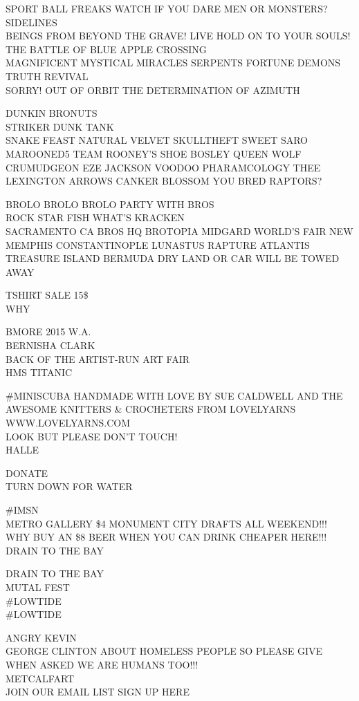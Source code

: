 \documentclass[10pt,letterpaper]{article}
\begin{document}
SPORT BALL FREAKS WATCH IF YOU DARE MEN OR MONSTERS?  SIDELINES\\
BEINGS FROM BEYOND THE GRAVE!   LIVE HOLD ON TO YOUR SOULS!  THE BATTLE OF BLUE APPLE CROSSING\\
MAGNIFICENT MYSTICAL MIRACLES SERPENTS FORTUNE DEMONS TRUTH REVIVAL\\
SORRY!  OUT OF ORBIT THE DETERMINATION OF AZIMUTH

DUNKIN BRONUTS\\
STRIKER DUNK TANK\\
SNAKE FEAST NATURAL VELVET SKULLTHEFT SWEET SARO MAROONED5 TEAM ROONEY'S SHOE BOSLEY QUEEN WOLF CRUMUDGEON EZE JACKSON VOODOO PHARAMCOLOGY THEE LEXINGTON ARROWS CANKER BLOSSOM YOU BRED RAPTORS?

BROLO BROLO BROLO PARTY WITH BROS\\
ROCK STAR FISH WHAT'S KRACKEN\\
SACRAMENTO CA BROS HQ BROTOPIA MIDGARD WORLD'S FAIR NEW MEMPHIS CONSTANTINOPLE LUNASTUS RAPTURE ATLANTIS TREASURE ISLAND BERMUDA DRY LAND OR CAR WILL BE TOWED AWAY

TSHIRT SALE 15\$\\
WHY

BMORE 2015 W.A.\\
BERNISHA CLARK\\
BACK OF THE ARTIST{-}RUN ART FAIR\\
HMS TITANIC

\#MINISCUBA HANDMADE WITH LOVE BY SUE CALDWELL AND THE AWESOME KNITTERS \& CROCHETERS FROM LOVELYARNS WWW.LOVELYARNS.COM\\
LOOK BUT PLEASE DON'T TOUCH!\\
HALLE

DONATE\\
TURN DOWN FOR WATER

\#IMSN\\
METRO GALLERY \$4 MONUMENT CITY DRAFTS ALL WEEKEND!!!  WHY BUY AN \$8 BEER WHEN YOU CAN DRINK CHEAPER HERE!!!\\
DRAIN TO THE BAY

DRAIN TO THE BAY\\
MUTAL FEST\\
\#LOWTIDE\\
\#LOWTIDE

ANGRY KEVIN\\
GEORGE CLINTON ABOUT HOMELESS PEOPLE SO PLEASE GIVE WHEN ASKED WE ARE HUMANS TOO!!!\\
METCALFART\\
JOIN OUR EMAIL LIST SIGN UP HERE
\end{document}
